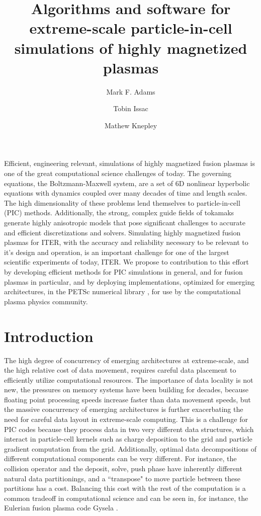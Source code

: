 \documentclass[review]{siamart}
\title{Algorithms and software for extreme-scale particle-in-cell simulations of highly magnetized plasmas}
\author{Mark F. Adams\and Tobin Issac\and Mathew Knepley}
\begin{document}
\maketitle

Efficient, engineering relevant, simulations of highly magnetized fusion plasmas is one of the great computational science challenges of today.
The governing equations, the Boltzmann-Maxwell system, are a set of 6D nonlinear hyperbolic equations with dynamics coupled over many decades of time and length scales.
The high dimensionality of these problems lend themselves to particle-in-cell (PIC) methods.
Additionally, the strong, complex guide fields of tokamaks generate highly anisotropic models that pose significant challenges to accurate and efficient discretizations and solvers.
Simulating highly magnetized fusion plasmas for ITER, with the accuracy and reliability necessary to be relevant to it's design and operation, is an important challenge for one of the largest scientific experiments of today, ITER.
We propose to contribution to this effort by developing efficient methods for PIC simulations in general, and for fusion plasmas in particular, and by deploying implementations, optimized for emerging architectures, in the PETSc numerical library \cite{KnepleyBrownMcInnesSmithRuppAdams2015b}, for use by the computational plasma physics community.

\section{Introduction}

The high degree of concurrency of emerging architectures at extreme-scale, and the high relative cost of data movement, requires careful data placement to efficiently utilize computational resources.
The importance of data locality is not new, the pressures on memory systems have been building for decades, because floating point processing speeds increase faster than data movement speeds, but the massive concurrency of emerging architectures is further exacerbating the need for careful data layout in extreme-scale computing.
This is a challenge for PIC codes because they process data in two very different data structures, which interact in particle-cell kernels such as charge deposition to the grid and particle gradient computation from the grid.
Additionally, optimal data decompositions of different computational components can be very different.
For instance, the collision operator and the deposit, solve, push phase have inherently different natural data partitionings, and a ``transpose" to move particle between these partitions has a cost.
Balancing this cost with the rest of the computation is a common tradeoff in computational science and can be seen in, for instance, the Eulerian fusion plasma code Gysela \cite{Bigot13}.
\end{document}
